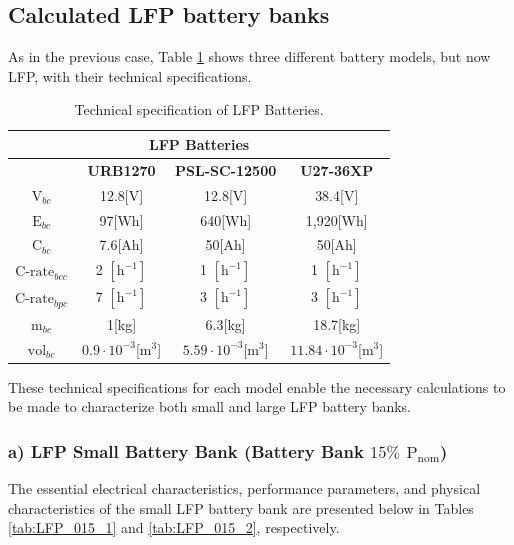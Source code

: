  

 
\subsection{Calculated LFP battery banks}

As in the previous case, Table \ref{tab:Technical_inputLFP} shows three different battery models, but now LFP, with their technical specifications.

\begin{table}[H]
	\centering
	\caption{Technical specification of LFP Batteries.}
	\label{tab:Technical_inputLFP}
	\begin{tabular}{|c|c|c|c|}
		\hline
		\multicolumn{4}{|c|}{\textbf{LFP Batteries}} \\
		\hline\hline
		 &  \textbf{URB1270} & \textbf{PSL-SC-12500} & \textbf{U27-36XP}\\
		 \hline
		$\text{V}_{bc}$ & 12.8[V]  & 12.8[V] & 38.4[V] \\	
		\hline
		$\text{E}_{bc}$ &  97[Wh] & 640[Wh] & 1,920[Wh]\\	
		\hline
		$\text{C}_{bc}$ &  7.6[Ah] & 50[Ah] & 50[Ah]\\	
		\hline
		$\text{C-rate}_{bcc}$ & 2 $[\text{h}^{-1}]$  & 1 $[\text{h}^{-1}]$ & 1 $[\text{h}^{-1}]$\\	
		\hline
		$\text{C-rate}_{bpc}$ & 7 $[\text{h}^{-1}]$  & 3 $[\text{h}^{-1}]$  & 3 $[\text{h}^{-1}]$\\	
		\hline
		$\text{m}_{bc}$ & 1[kg]& 6.3[kg] & 18.7[kg]\\	
		\hline
		$\text{vol}_{bc}$ &  $0.9\cdot{10}^{-3}$[${\text{m}}^{3}$]& $5.59\cdot{10}^{-3}$[${\text{m}}^{3}$] & $11.84\cdot{10}^{-3}$[${\text{m}}^{3}$]    \\	
		\hline
	\end{tabular}
\end{table} 

These technical specifications for each model enable the necessary calculations to be made to characterize both small and large LFP battery banks.

\subsubsection{a) LFP Small Battery Bank (Battery Bank $15\%$ ${\text{P}}_{\text{nom}}$)}

The essential electrical characteristics, performance parameters, and physical characteristics of the small LFP battery bank are presented below in Tables \ref{tab:LFP_015_1} and \ref{tab:LFP_015_2}, respectively.

